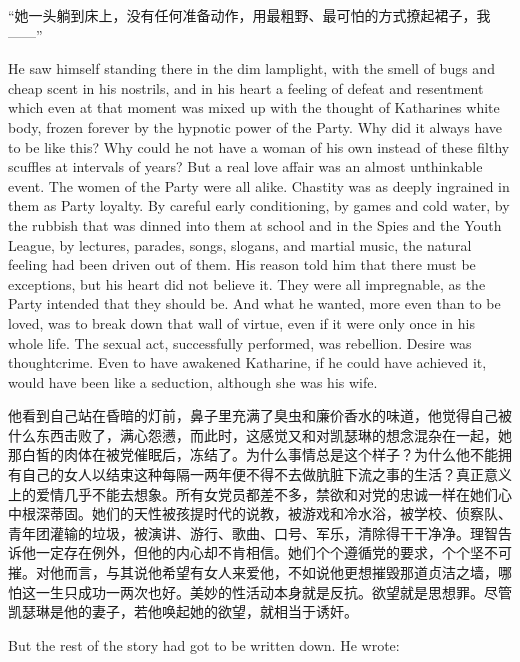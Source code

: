 \begin{paracol}{2}
\switchcolumn

``她一头躺到床上，没有任何准备动作，用最粗野、最可怕的方式撩起裙子，我——''

\switchcolumn*

He saw himself standing there in the dim lamplight, with the smell of
bugs and cheap scent in his nostrils, and in his heart a feeling of
defeat and resentment which even at that moment was mixed up with the
thought of Katharine\textquotesingle s white body, frozen forever by the
hypnotic power of the Party. Why did it always have to be like this? Why
could he not have a woman of his own instead of these filthy scuffles at
intervals of years? But a real love affair was an almost unthinkable
event. The women of the Party were all alike. Chastity was as deeply
ingrained in them as Party loyalty. By careful early conditioning, by
games and cold water, by the rubbish that was dinned into them at school
and in the Spies and the Youth League, by lectures, parades, songs,
slogans, and martial music, the natural feeling had been driven out of
them. His reason told him that there must be exceptions, but his heart
did not believe it. They were all impregnable, as the Party intended
that they should be. And what he wanted, more even than to be loved, was
to break down that wall of virtue, even if it were only once in his
whole life. The sexual act, successfully performed, was rebellion.
Desire was thoughtcrime. Even to have awakened Katharine, if he could
have achieved it, would have been like a seduction, although she was his
wife.

\switchcolumn

他看到自己站在昏暗的灯前，鼻子里充满了臭虫和廉价香水的味道，他觉得自己被什么东西击败了，满心怨懑，而此时，这感觉又和对凯瑟琳的想念混杂在一起，她那白皙的肉体在被党催眠后，冻结了。为什么事情总是这个样子？为什么他不能拥有自己的女人以结束这种每隔一两年便不得不去做肮脏下流之事的生活？真正意义上的爱情几乎不能去想象。所有女党员都差不多，禁欲和对党的忠诚一样在她们心中根深蒂固。她们的天性被孩提时代的说教，被游戏和冷水浴，被学校、侦察队、青年团灌输的垃圾，被演讲、游行、歌曲、口号、军乐，清除得干干净净。理智告诉他一定存在例外，但他的内心却不肯相信。她们个个遵循党的要求，个个坚不可摧。对他而言，与其说他希望有女人来爱他，不如说他更想摧毁那道贞洁之墙，哪怕这一生只成功一两次也好。美妙的性活动本身就是反抗。欲望就是思想罪。尽管凯瑟琳是他的妻子，若他唤起她的欲望，就相当于诱奸。

\switchcolumn*

But the rest of the story had got to be written down. He wrote:


\end{paracol}
